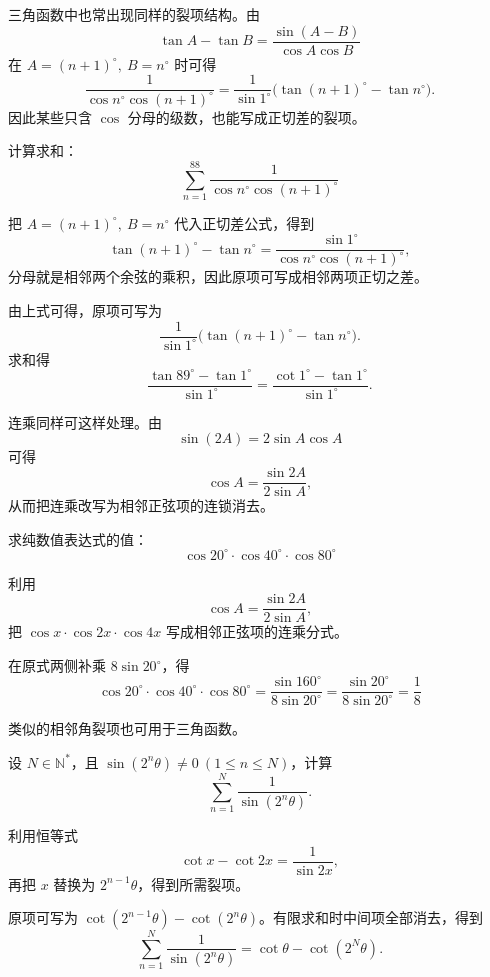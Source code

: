 三角函数中也常出现同样的裂项结构。由
\[
\tan A-\tan B=\frac{\sin(A-B)}{\cos A\cos B}
\]
在 \(A=(n+1)^\circ,\ B=n^\circ\) 时可得
\[
\frac{1}{\cos n^\circ\cos(n+1)^\circ}=\frac{1}{\sin1^\circ}\bigl(\tan(n+1)^\circ-\tan n^\circ\bigr).
\]
因此某些只含 \(\cos\) 分母的级数，也能写成正切差的裂项。

\begin{example}[$\displaystyle\sum_{n=1}^{88}\frac{1}{\cos n^\circ\cos(n+1)^\circ}$]
    计算求和：\[\sum_{n=1}^{88} \frac{1}{\cos n^\circ \cos (n+1)^\circ}\]
\end{example}
\begin{solution}
把 \(A=(n+1)^\circ,\ B=n^\circ\) 代入正切差公式，得到
\[
\tan(n+1)^\circ-\tan n^\circ=\frac{\sin1^\circ}{\cos n^\circ\cos(n+1)^\circ},
\]
分母就是相邻两个余弦的乘积，因此原项可写成相邻两项正切之差。

由上式可得，原项可写为
\[
\frac{1}{\sin 1^\circ}\bigl(\tan(n+1)^\circ-\tan n^\circ\bigr).
\]
求和得
\[
\frac{\tan 89^\circ - \tan 1^\circ}{\sin 1^\circ} = \frac{\cot 1^\circ - \tan 1^\circ}{\sin 1^\circ}.
\]

\end{solution}

连乘同样可这样处理。由
\[
\sin(2A)=2\sin A\cos A
\]
可得
\[
\cos A=\frac{\sin2A}{2\sin A},
\]
从而把连乘改写为相邻正弦项的连锁消去。

\begin{example}
    求纯数值表达式的值：\[\cos 20^\circ \cdot \cos 40^\circ \cdot \cos 80^\circ\]
\end{example}
\begin{solution}
利用
\[
\cos A=\frac{\sin2A}{2\sin A},
\]
把 \(\cos x\cdot\cos2x\cdot\cos4x\) 写成相邻正弦项的连乘分式。

在原式两侧补乘 \(8\sin 20^\circ\)，得
\[
\cos 20^\circ \cdot \cos 40^\circ \cdot \cos 80^\circ = \frac{\sin 160^\circ}{8\sin 20^\circ} = \frac{\sin 20^\circ}{8\sin 20^\circ} = \frac{1}{8}
\]

\end{solution}

类似的相邻角裂项也可用于三角函数。

\begin{example}[$\displaystyle\sum_{n=1}^{N} \frac{1}{\sin(2^n \theta)}$]
    设 \(N\in\mathbb N^*\)，且 \(\sin(2^n\theta)\ne0\ (1\le n\le N)\)，计算
    \[\sum_{n=1}^{N} \frac{1}{\sin(2^n \theta)}.\]
\end{example}
\begin{solution}
利用恒等式
\[
\cot x-\cot 2x=\frac{1}{\sin 2x},
\]
再把 \(x\) 替换为 \(2^{n-1}\theta\)，得到所需裂项。

原项可写为 \(\cot(2^{n-1}\theta) - \cot(2^n\theta)\)。有限求和时中间项全部消去，得到
\[
\sum_{n=1}^{N}\frac{1}{\sin(2^n\theta)}
=\cot\theta-\cot(2^N\theta).
\]

\end{solution}

